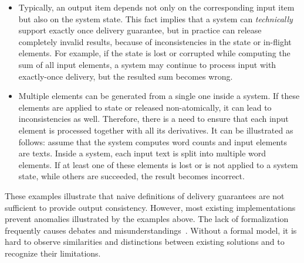 
\begin{itemize}
    \item Typically, an output item depends not only on the corresponding input item but also on the system state. This fact implies that a system can {\em technically} support exactly once delivery guarantee, but in practice can release completely invalid results, because of inconsistencies in the state or in-flight elements. For example, if the state is lost or corrupted while computing the sum of all input elements, a system may continue to process input with exactly-once delivery, but the resulted sum becomes wrong. 
    \item Multiple elements can be generated from a single one inside a system. If these elements are applied to state or released non-atomically, it can lead to inconsistencies as well. Therefore, there is a need to ensure that each input element is processed together with all its derivatives. It can be illustrated as follows: assume that the system computes word counts and input elements are texts. Inside a system, each input text is split into multiple word elements. If at least one of these elements is lost or is not applied to a system state, while others are succeeded, the result becomes incorrect. 
\end{itemize}

These examples illustrate that naive definitions of delivery guarantees are not sufficient to provide output consistency. However, most existing implementations prevent anomalies illustrated by the examples above. The lack of formalization frequently causes debates and misunderstandings~\cite{JerryPengStreamIO, PaperTrail}. Without a formal model, it is hard to observe similarities and distinctions between existing solutions and to recognize their limitations.


